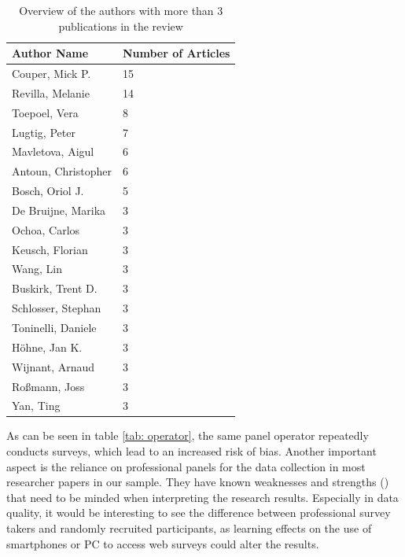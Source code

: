 \begin{table}
	\centering
	\begin{tabular}{ll}
		\toprule
		Author Name & Number of Articles \\
		\midrule
		Couper, Mick P. &        15 \\
        Revilla, Melanie &      14\\
        Toepoel, Vera  &         8\\
        Lugtig, Peter   &        7\\
        Mavletova, Aigul    &    6\\
        Antoun, Christopher  &   6\\
        Bosch, Oriol J.   &      5\\
        De Bruijne, Marika  &    3\\
        Ochoa, Carlos      &     3\\
        Keusch, Florian     &    3\\
        Wang, Lin           &    3\\
        Buskirk, Trent D.     &  3\\
        Schlosser, Stephan  &   3\\
        Toninelli, Daniele   &   3\\
        Höhne, Jan K.        &   3\\
        Wijnant, Arnaud      &   3\\
        Roßmann, Joss       &    3\\
        Yan, Ting            &   3\\
		\bottomrule 
	\end{tabular}
	\caption{Overview of the authors with more than 3 publications in the review}
	\label{tab: authors}
\end{table}

As can be seen in table \ref{tab: operator}, the same panel operator repeatedly conducts surveys, which lead to an increased risk of bias. Another important aspect is the reliance on professional panels for the data collection in most researcher papers in our sample. They have known weaknesses and strengths (\cite{callegaro_online_2014, kees_analysis_2017}) that need to be minded when interpreting the research results. Especially in data quality, it would be interesting to see the difference between professional survey takers and randomly recruited participants, as learning effects on the use of smartphones or PC to access web surveys could alter the results.


